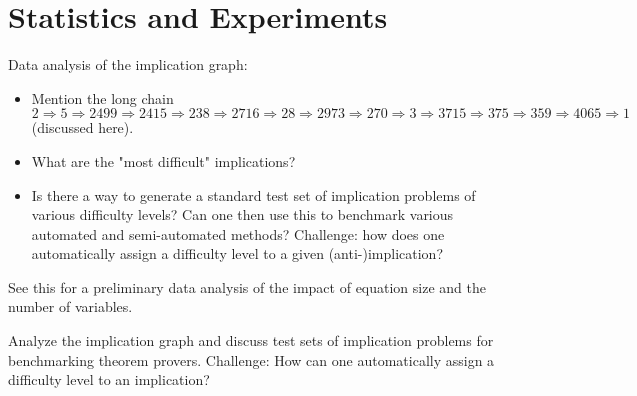 \section{Statistics and Experiments}


Data analysis of the implication graph:

\begin{itemize}
    \item Mention the long chain $2 \Rightarrow 5 \Rightarrow 2499 \Rightarrow 2415 \Rightarrow 238 \Rightarrow 2716 \Rightarrow 28 \Rightarrow 2973 \Rightarrow 270 \Rightarrow 3 \Rightarrow 3715 \Rightarrow 375 \Rightarrow 359 \Rightarrow 4065 \Rightarrow 1$ (discussed here).
    \item What are the "most difficult" implications?
    \item Is there a way to generate a standard test set of implication problems of various difficulty levels? Can one then use this to benchmark various automated and semi-automated methods? Challenge: how does one automatically assign a difficulty level to a given (anti-)implication?
\end{itemize}

See this for a preliminary data analysis of the impact of equation size and the number of variables.

Analyze the implication graph and discuss test sets of implication problems for benchmarking theorem provers. Challenge: How can one automatically assign a difficulty level to an implication?
